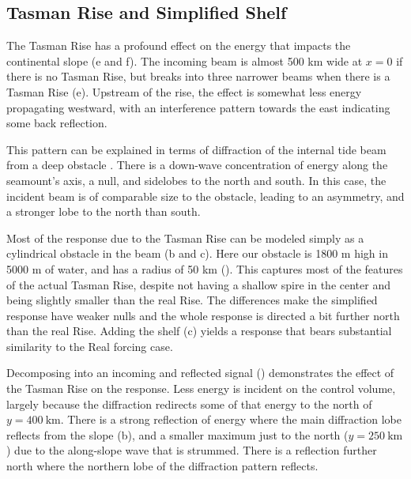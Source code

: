 \documentclass[12pt]{article}
\newcommand{\tempS}[1]{}
\newcommand{\mn}[1]{{\sc #1}}
\begin{document}
\subsection{Tasman Rise and Simplified Shelf}

The Tasman Rise has a profound effect on the energy that impacts the continental slope (e and f).  The incoming beam is almost 500 km wide at $x=0$ if there is no Tasman Rise, but breaks into three narrower beams when there is a Tasman Rise (e).  Upstream of the rise, the effect is somewhat less energy propagating westward, with an  interference pattern towards the east indicating some back reflection.  



This pattern can be explained in terms of diffraction of the internal tide beam from a deep obstacle \citep[i.e.][]{johnstonetal03}.  There is a down-wave concentration of energy along the seamount's axis, a null, and sidelobes to the north and south.  In this case, the incident beam is of comparable size to the obstacle, leading to an asymmetry, and a stronger lobe to the north than south.  

Most of the response due to the Tasman Rise can be modeled simply as a cylindrical obstacle in the beam (b and c).  Here our obstacle is 1800 m high in 5000 m of water, and has a radius of 50 km ().  This captures most of the features of the actual Tasman Rise, despite not having a shallow spire in the center and being slightly smaller than the real Rise.  The differences make the simplified response have weaker nulls and the whole response is directed a bit further north than the real Rise.  Adding the shelf (c) yields a response that bears substantial similarity to the \mn{Real} forcing case.  

Decomposing into an incoming and reflected signal () demonstrates the effect of the Tasman Rise on the response.  Less energy is incident on the control volume, largely because the diffraction redirects some of that energy to the north of $y=400\ \mathrm{km}$.  There is a strong reflection of energy where the main diffraction lobe reflects from the slope (b), and a smaller maximum just to the north ($y=250\ \mathrm{km}$) due to the along-slope wave that is strummed.  There is a reflection further north where the northern lobe of the diffraction pattern reflects.  
\end{document}
